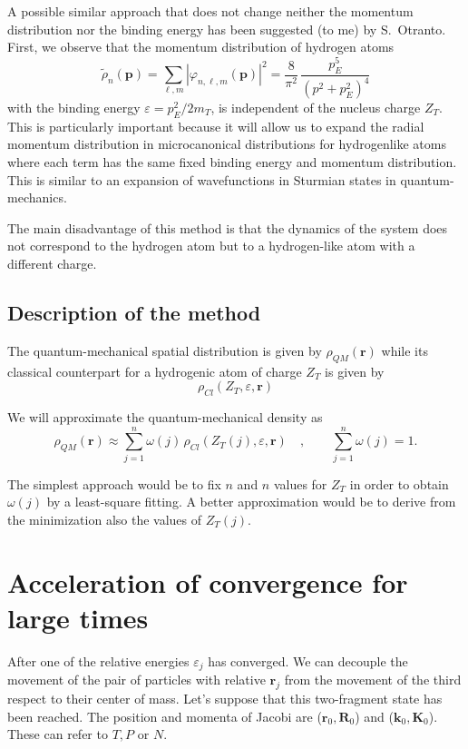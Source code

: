  A possible similar approach that does not change neither the momentum
distribution nor the binding energy has been suggested (to me) by S.~Otranto. First, we observe
that the momentum distribution of hydrogen atoms
\begin{equation}\label{Q:class-momen-distr-hydro}
  \tilde{\rho}_{n}(\bm{p}) = \sum_{\ell, m} \left| \varphi_{n,\ell,m}(\bm{p})\right|^{2} 
  = \frac{8 }{\pi^{2}} \, \frac{p_{E}^{5}}{\left( p^{2} + p_{E}^{2} \right)^{4}}
\end{equation}
with the binding energy $\varepsilon=p_{E}^{2}/2 m_{T}$, is independent of the
nucleus charge $Z_{T}$. This is particularly important because it will allow us
to expand the radial momentum distribution in microcanonical distributions for
hydrogenlike atoms where each term has the same fixed binding energy and
momentum distribution. This is similar to an expansion of wavefunctions in
Sturmian states in quantum-mechanics.

The main disadvantage of this method is that the dynamics of the system does not
correspond to the hydrogen atom but to a hydrogen-like atom with a different
charge.

\subsection{Description of the method}
\label{S:description-method}

The quantum-mechanical spatial distribution is given by $\rho_{QM}(\bm{r})$
while its classical counterpart for a hydrogenic atom of charge $Z_{T}$ is given by
\begin{equation}\label{Q:class-spati-distr-hydro}
  \rho_{Cl}(Z_{T}, \varepsilon, \bm{r})
\end{equation}

We will approximate the quantum-mechanical density as
\begin{equation}\label{Q:fitti-densi}
  \rho_{QM}(\bm{r}) \approx \sum_{j=1}^{n} \omega(j) \, \rho_{Cl}(Z_{T}(j), \varepsilon, \bm{r}) \quad, \qquad
  \sum_{j=1}^{n} \omega(j) = 1.
\end{equation}

The simplest approach would be to fix $n$ and $n$ values for $Z_{T}$ in order to
obtain $\omega(j)$ by a least-square fitting. A better approximation would be to
derive from the minimization also the values of $Z_{T}(j)$.

\section{Acceleration of convergence for large times}
After one of the relative energies $\varepsilon_{j}$ has converged. We
can decouple the movement of the pair of particles with relative
$\bm{r}_{j}$ from the movement of the third respect to their center of
mass. Let's suppose that this two-fragment state has been reached. The
position and momenta of Jacobi are ($\bm{r}_{0},\bm{R}_{0}$) and
($\bm{k}_{0},\bm{K}_{0}$). These can refer to $T,P$ or $N$.

